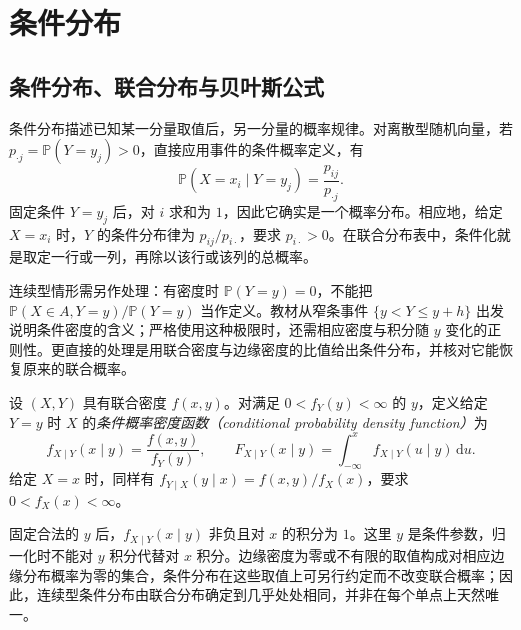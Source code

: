 \section{条件分布}
\label{sec:study-conditional-distributions}

\subsection{条件分布、联合分布与贝叶斯公式}

条件分布描述已知某一分量取值后，另一分量的概率规律。对离散型随机向量，若 $p_{\cdot j}=\mathbb P(Y=y_j)>0$，直接应用事件的条件概率定义，有
\begin{equation}
  \mathbb P(X=x_i\mid Y=y_j)=\frac{p_{ij}}{p_{\cdot j}}.
  \label{eq:study-ch3-conditional-pmf}
\end{equation}
固定条件 $Y=y_j$ 后，对 $i$ 求和为 $1$，因此它确实是一个概率分布。相应地，给定 $X=x_i$ 时，$Y$ 的条件分布律为 $p_{ij}/p_{i\cdot}$，要求 $p_{i\cdot}>0$。在联合分布表中，条件化就是取定一行或一列，再除以该行或该列的总概率。

连续型情形需另作处理：有密度时 $\mathbb P(Y=y)=0$，不能把 $\mathbb P(X\in A,Y=y)/\mathbb P(Y=y)$ 当作定义。教材从窄条事件 $\{y<Y\le y+h\}$ 出发说明条件密度的含义；严格使用这种极限时，还需相应密度与积分随 $y$ 变化的正则性。更直接的处理是用联合密度与边缘密度的比值给出条件分布，并核对它能恢复原来的联合概率。

\begin{definition}
\label{def:study-ch3-conditional-density}
设 $(X,Y)$ 具有联合密度 $f(x,y)$。对满足 $0<f_Y(y)<\infty$ 的 $y$，定义给定 $Y=y$ 时 $X$ 的\emph{条件概率密度函数（conditional probability density function）}为
\begin{equation}
  f_{X\mid Y}(x\mid y)=\frac{f(x,y)}{f_Y(y)},\qquad
  F_{X\mid Y}(x\mid y)=\int_{-\infty}^x f_{X\mid Y}(u\mid y)\,\mathrm du.
  \label{eq:study-ch3-conditional-density}
\end{equation}
给定 $X=x$ 时，同样有 $f_{Y\mid X}(y\mid x)=f(x,y)/f_X(x)$，要求 $0<f_X(x)<\infty$。
\end{definition}

固定合法的 $y$ 后，$f_{X\mid Y}(x\mid y)$ 非负且对 $x$ 的积分为 $1$。这里 $y$ 是条件参数，归一化时不能对 $y$ 积分代替对 $x$ 积分。边缘密度为零或不有限的取值构成对相应边缘分布概率为零的集合，条件分布在这些取值上可另行约定而不改变联合概率；因此，连续型条件分布由联合分布确定到几乎处处相同，并非在每个单点上天然唯一。

